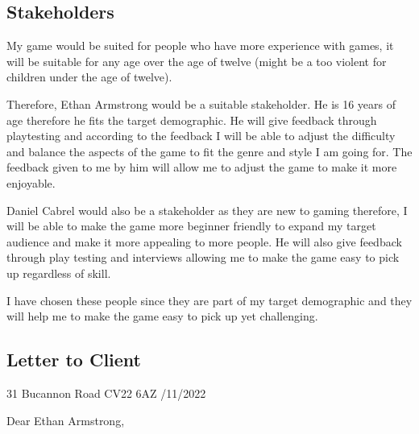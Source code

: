 \documentclass{article}
\newcommand{\parBr}{\vspace{5mm}}%
\begin{document}
\subsection{Stakeholders}
My game would be suited for people who have more experience with games, it will be suitable for any age over the age of twelve (might be a too violent for children under the age of twelve). 

\parBr

Therefore, Ethan Armstrong would be a suitable stakeholder. He is 16 years of age therefore he fits the target demographic. He will give feedback through playtesting and according to the feedback I will be able to adjust the difficulty and balance the aspects of the game to fit the genre and style I am going for. The feedback given to me by him will allow me to adjust the game to make it more enjoyable. 

\parBr

Daniel Cabrel would also be a stakeholder as they are new to gaming therefore, I will be able to make the game more beginner friendly to expand my target audience and make it more appealing to more people. He will also give feedback through play testing and interviews allowing me to make the game easy to pick up regardless of skill. 

\parBr

I have chosen these people since they are part of my target demographic and they will help me to make the game easy to pick up yet challenging.

\subsection{Letter to Client}
\begin{flushright}
31 Bucannon Road \linebreak CV22 6AZ /11/2022
\end{flushright}

Dear Ethan Armstrong, 

\parBr
\end{document}
